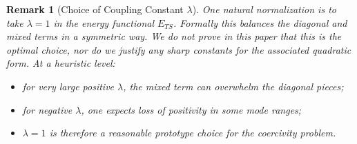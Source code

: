 \documentclass[12pt,a4paper]{article}
\newtheorem{remark}[theorem]{Remark}
\begin{document}
\begin{remark}[Choice of Coupling Constant $\lambda$]\label{rem:lambda-choice}
One natural normalization is to take $\lambda = 1$ in the energy functional $E_{TS}$. Formally this balances the diagonal and mixed terms in a symmetric way. We do \emph{not} prove in this paper that this is the optimal choice, nor do we justify any sharp constants for the associated quadratic form. At a heuristic level:
\begin{itemize}
    \item for very large positive $\lambda$, the mixed term can overwhelm the diagonal pieces;
    \item for negative $\lambda$, one expects loss of positivity in some mode ranges;
    \item $\lambda = 1$ is therefore a reasonable prototype choice for the coercivity problem.
\end{itemize}
\end{remark}
\end{document}
